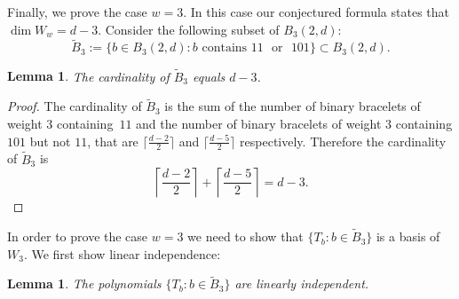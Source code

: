 \documentclass[pdftex]{sigma}
\numberwithin{equation}{section}
\newtheorem{Lemma}[Theorem]{Lemma}
\begin{document}
Finally, we prove the case $w=3$. In this case our conjectured formula states that $\dim W_w = d-3$. Consider the following subset of $B_3(2,d)$:
\begin{equation*}
		\tilde{B}_3:=\{b\in B_3(2,d)\colon b \text{ contains } 11 \text{ {or} } 101\}\subset B_3(2,d).
\end{equation*}
\begin{Lemma}
The cardinality of $\tilde{B}_3$ equals $d-3$.
\end{Lemma}
\begin{proof}
 The cardinality of $\tilde{B}_3$ is the sum of the number of binary bracelets of weight $3$ containing~$11$ and the number of binary bracelets of weight $3$ containing $101$ but not $11$, that are $\big\lceil \frac{d-2}{2}\big\rceil$ and $\big\lceil \frac{d-5}{2}\big\rceil$ respectively.
Therefore the cardinality of $\tilde{B}_3$ is
\[
\left\lceil \frac{d-2}{2}\right\rceil+\left\lceil \frac{d-5}{2}\right\rceil=d-3. \tag*{\qed}
\]	\renewcommand{\qed}{}
\end{proof}

In order to prove the case $w=3$ we need to show that $\big\{T_b\colon b\in \tilde{B}_3\big\}$ is a basis of $W_3$. We first show linear independence:
\begin{Lemma}\label{lemma:w3Indep}
The polynomials $\big\{T_b\colon b\in \tilde{B}_3\big\}$ are linearly independent.
\end{Lemma}
\end{document}
